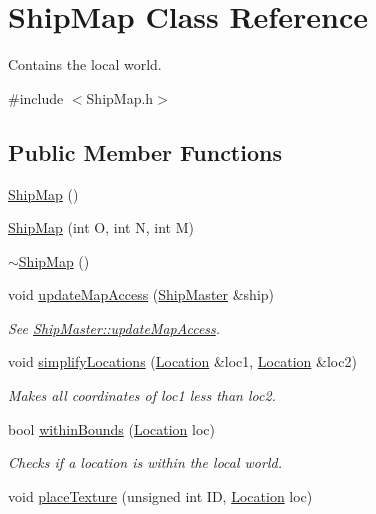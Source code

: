 \hypertarget{classShipMap}{\section{Ship\-Map Class Reference}
\label{classShipMap}
}


Contains the local world.  




{\ttfamily \#include $<$Ship\-Map.\-h$>$}

\subsection*{Public Member Functions}
\begin{DoxyCompactItemize}
\item 
\hyperlink{classShipMap_af52a69332839e08c8f4c6e24758f32da}{Ship\-Map} ()
\item 
\hyperlink{classShipMap_a0c3e21f65831db22a2c276f54b2584f7}{Ship\-Map} (int O, int N, int M)
\item 
\hyperlink{classShipMap_a82afc59f9e7ed5b8d208de36bab9236c}{$\sim$\-Ship\-Map} ()
\item 
void \hyperlink{classShipMap_a7c66418320a5bb788dbbe3a122e76cd7}{update\-Map\-Access} (\hyperlink{classShipMaster}{Ship\-Master} \&ship)
\begin{DoxyCompactList}\small\item\em See \hyperlink{classShipMaster_a73b87519cbfc8289f9628695ebcc0cdb}{Ship\-Master\-::update\-Map\-Access}. \end{DoxyCompactList}\item 
void \hyperlink{classShipMap_a2ff8a4864984373340f94eaed37debe7}{simplify\-Locations} (\hyperlink{structLocation}{Location} \&loc1, \hyperlink{structLocation}{Location} \&loc2)
\begin{DoxyCompactList}\small\item\em Makes all coordinates of loc1 less than loc2. \end{DoxyCompactList}\item 
bool \hyperlink{classShipMap_a6817875f83a1ae67fe9124823b80b4b1}{within\-Bounds} (\hyperlink{structLocation}{Location} loc)
\begin{DoxyCompactList}\small\item\em Checks if a location is within the local world. \end{DoxyCompactList}\item 
void \hyperlink{classShipMap_a01d56312b189102d019a1da898957b73}{place\-Texture} (unsigned int I\-D, \hyperlink{structLocation}{Location} loc)

\end{DoxyCompactItemize}
